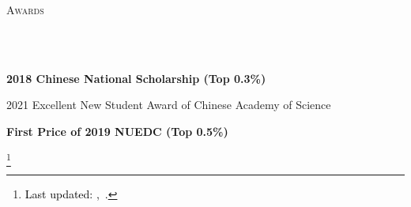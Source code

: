 \documentclass{article}
\newcommand\blfootnote[1]{%
  \begingroup
  \renewcommand\thefootnote{}\footnote{#1}%
  \addtocounter{footnote}{-1}%
  \endgroup
}
\newcommand{\header}[1]{{
\hspace*{-15pt}\vspace*{6pt} \textsc{#1}} \vspace*{-6pt} 
\lineunder
}
\newcommand{\lineunder}{
\vspace*{-8pt} \\ \hspace*{-18pt} 
\hrulefill \\
}
\renewcommand{\labelitemii}{
$\vcenter{\hbox{\tiny$\bullet$}}$\hspace*{-3pt}
}
\newenvironment{bullet-list-major}{
\begin{list}{\labelitemii}{\setlength\leftmargin{3pt} 
\topsep 0pt \itemsep -2pt}}{\vspace*{4pt}\end{list}
}
\begin{document}
\vspace*{4pt}%
\header{Awards}
\begin{bullet-list-major}
    \item \textbf{2018 Chinese National Scholarship (Top 0.3\%)}
    \vspace{2pt}
    \item 2021 Excellent New Student Award of Chinese Academy of Science
    \vspace{2pt}
    \item \textbf{First Price of 2019 NUEDC (Top 0.5\%)}
\end{bullet-list-major}

\blfootnote{
\textcolor{black}{Last updated: \monthname,~\the\year.} \vspace{1mm}
}
\end{document}
